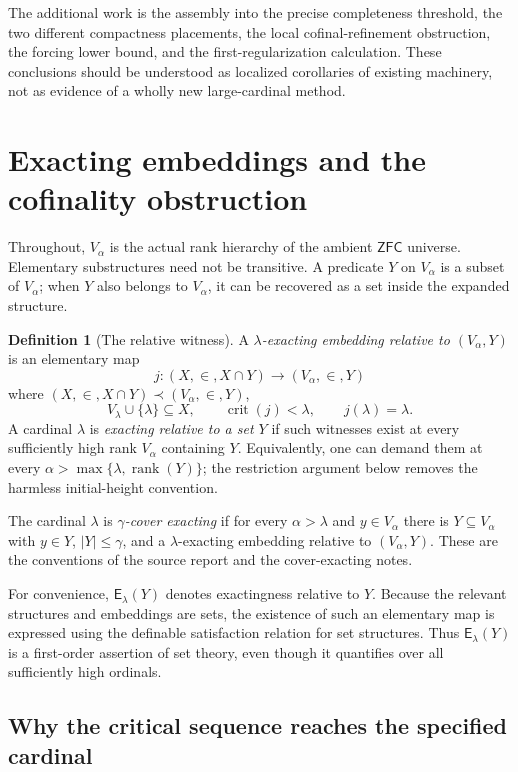 \documentclass[11pt,letterpaper]{article}
\theoremstyle{definition}
\newtheorem{definition}{Definition}[section]
\newcommand{\ZFC}{\mathsf{ZFC}}
\newcommand{\crit}{\operatorname{crit}}
\newcommand{\rank}{\operatorname{rank}}
\newcommand{\Erel}{\mathsf{E}}
\begin{document}
The additional work is the assembly into the precise completeness threshold, the two different compactness placements, the local cofinal-refinement obstruction, the forcing lower bound, and the first-regularization calculation. These conclusions should be understood as localized corollaries of existing machinery, not as evidence of a wholly new large-cardinal method.

\section{Exacting embeddings and the cofinality obstruction}\label{sec:exacting}

Throughout, $V_\alpha$ is the actual rank hierarchy of the ambient $\ZFC$ universe. Elementary substructures need not be transitive. A predicate $Y$ on $V_\alpha$ is a subset of $V_\alpha$; when $Y$ also belongs to $V_\alpha$, it can be recovered as a set inside the expanded structure.

\begin{definition}[The relative witness]
A \emph{$\lambda$-exacting embedding relative to $(V_\alpha,Y)$} is an elementary map
\[
 j:(X,\in,X\cap Y)\longrightarrow(V_\alpha,\in,Y)
\]
where $(X,\in,X\cap Y)\prec(V_\alpha,\in,Y)$,
\[
 V_\lambda\cup\{\lambda\}\subseteq X,
 \qquad \crit(j)<\lambda,
 \qquad j(\lambda)=\lambda.
\]
A cardinal $\lambda$ is \emph{exacting relative to a set $Y$} if such witnesses exist at every sufficiently high rank $V_\alpha$ containing $Y$. Equivalently, one can demand them at every $\alpha>\max\{\lambda,\rank(Y)\}$; the restriction argument below removes the harmless initial-height convention.

The cardinal $\lambda$ is \emph{$\gamma$-cover exacting} if for every $\alpha>\lambda$ and $y\in V_\alpha$ there is $Y\subseteq V_\alpha$ with $y\in Y$, $|Y|\leq\gamma$, and a $\lambda$-exacting embedding relative to $(V_\alpha,Y)$. These are the conventions of the source report and the cover-exacting notes.\cite{source,cover}
\end{definition}

For convenience, $\Erel_\lambda(Y)$ denotes exactingness relative to $Y$. Because the relevant structures and embeddings are sets, the existence of such an elementary map is expressed using the definable satisfaction relation for set structures. Thus $\Erel_\lambda(Y)$ is a first-order assertion of set theory, even though it quantifies over all sufficiently high ordinals.

\subsection{Why the critical sequence reaches the specified cardinal}
\end{document}
